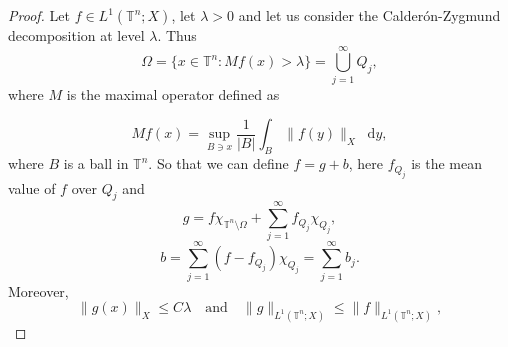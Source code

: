 \documentclass[12pt, reqno]{amsart}
\theoremstyle{definition}
\theoremstyle{remark}
\numberwithin{equation}{section}
\newcommand*\diff{\mathop{}\!\mathrm{d}}
\begin{document}
\begin{proof}
    Let $f \in L^1(\mathbb{T}^n; X)$, let $\lambda > 0$ and let us consider the Calderón-Zygmund decomposition at level $\lambda$. Thus 
    \begin{equation*}
        \Omega = \{x \in \mathbb{T}^n : Mf(x) > \lambda\} = \bigcup_{j=1}^\infty Q_j,
    \end{equation*}
    where $M$ is the maximal operator defined as

    \begin{equation*}
        Mf(x) = \sup_{B\ni x}\frac{1}{|B|}\int_B\|f(y)\|_X\diff y,
    \end{equation*} 
    where $B$ is a ball in $\mathbb{T}^n$. So that we can define $f = g + b$, here $f_{Q_j}$ is the mean value of $f$ over $Q_j$ and 
    \begin{equation*}
        g = f\chi_{\mathbb{T}^n \setminus \Omega} + \sum_{j=1}^\infty f_{Q_j}\chi_{Q_j},
    \end{equation*}
    \begin{equation*}
        b = \sum_{j=1}^\infty(f - f_{Q_j})\chi_{Q_j} = \sum_{j=1}^\infty b_j.
    \end{equation*}
    Moreover, 
    \begin{equation}
        \|g(x)\|_X \leq C\lambda \quad \text{and} \quad \|g\|_{L^1(\mathbb{T}^n; X)} \leq \|f\|_{L^1(\mathbb{T}^n; X)},
        \label{eq:1norm-X}
    \end{equation}
    

\end{proof}
\end{document}
